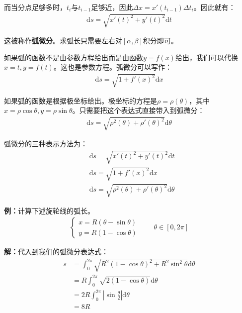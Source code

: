 \documentclass{ctexart}
\let\oldtextbf\textbf %
\renewcommand{\textbf}[1]{\textcolor{btex}{\oldtextbf{#1}}} %
\begin{document}
而当分点足够多时，$t_i$与$t_{i-1}$足够近，因此$\Delta x=x'(t_{i-1})\Delta t_i$。因此就有：
\begin{align*}
    \mathrm{d}s=\sqrt{x'(t)^2+y'(t)^2}\mathrm{d}t
\end{align*}

这被称作\textbf{弧微分}。求弧长只需要左右对$[\alpha,\beta]$积分即可。

如果弧的函数不是由参数方程给出而是由函数$y=f(x)$给出，我们可以代换$x=t,y=f(t)$。这也是参数方程。弧微分可以写作：
\begin{align*}
    \mathrm{d}s=\sqrt{1+f'(x)^2}\mathrm{d}x
\end{align*}

如果弧的函数是根据极坐标给出。极坐标的方程是$\rho=\rho(\theta)$，其中$x=\rho\cos\theta,y=\rho\sin \theta$。只需要把这个表达式直接带入到弧微分：
\begin{align*}
    \mathrm{d}s=\sqrt{\rho^2(\theta)+\rho'(\theta)^2}\mathrm{d}\theta
\end{align*}

\begin{tcolorbox}[
    colback=bac1,     %
    colframe=fra1,   %
    coltitle=white,             %
    coltext=tex1,
    title=弧微分的表示,
    fonttitle=\bfseries,        %
arc=3mm,                     %
breakable
]
弧微分的三种表示方法为：
\begin{align*}
    &\mathrm{d}s=\sqrt{x'(t)^2+y'(t)^2}\mathrm{d}t\\
    &\mathrm{d}s=\sqrt{1+f'(x)^2}\mathrm{d}x\\
&\mathrm{d}s=\sqrt{\rho^2(\theta)+\rho'(\theta)^2}\mathrm{d}\theta\tag{5-12}
\end{align*}
\end{tcolorbox}

\textbf{例：}计算下述旋轮线的弧长。
\begin{align*}
    \begin{cases}
        x=R(\theta-\sin\theta)\\
        y=R(1-\cos\theta)
    \end{cases}\qquad \theta\in[0,2\pi]
\end{align*}

\textbf{解：}代入到我们的弧微分表达式：
\begin{align*}
    s&=\int_0^{2\pi}\sqrt{R^2(1-\cos\theta)^2+R^2\sin^2\theta}\mathrm{d}\theta\\
    &=R\int_0^{2\pi}\sqrt{2(1-\cos\theta)}\mathrm{d}\theta\\
    &=2R\int_0^{2\pi}|\sin\frac{\theta}{2}|\mathrm{d}\theta\\
    &=8R
\end{align*}
\end{document}
